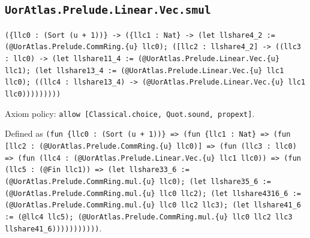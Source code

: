 \documentclass[11pt]{article}
\begin{document}
\subsection*{\texttt{UorAtlas.Prelude.Linear.Vec.smul}}
\noindent\texttt{(\{llc0 : (Sort (u + 1))\} -> (\{llc1 : Nat\} -> (let llshare4\_2 := (@UorAtlas.Prelude.CommRing.\{u\} llc0); ([llc2 : llshare4\_2] -> ((llc3 : llc0) -> (let llshare11\_4 := (@UorAtlas.Prelude.Linear.Vec.\{u\} llc1); (let llshare13\_4 := (@UorAtlas.Prelude.Linear.Vec.\{u\} llc1 llc0); ((llc4 : llshare13\_4) -> (@UorAtlas.Prelude.Linear.Vec.\{u\} llc1 llc0)))))))))}\par
\noindent Axiom policy: \texttt{allow [Classical.choice, Quot.sound, propext]}.\par
\noindent Defined as \texttt{(fun \{llc0 : (Sort (u + 1))\} => (fun \{llc1 : Nat\} => (fun [llc2 : (@UorAtlas.Prelude.CommRing.\{u\} llc0)] => (fun (llc3 : llc0) => (fun (llc4 : (@UorAtlas.Prelude.Linear.Vec.\{u\} llc1 llc0)) => (fun (llc5 : (@Fin llc1)) => (let llshare33\_6 := (@UorAtlas.Prelude.CommRing.mul.\{u\} llc0); (let llshare35\_6 := (@UorAtlas.Prelude.CommRing.mul.\{u\} llc0 llc2); (let llshare4316\_6 := (@UorAtlas.Prelude.CommRing.mul.\{u\} llc0 llc2 llc3); (let llshare41\_6 := (@llc4 llc5); (@UorAtlas.Prelude.CommRing.mul.\{u\} llc0 llc2 llc3 llshare41\_6)))))))))))}.\par
\end{document}
